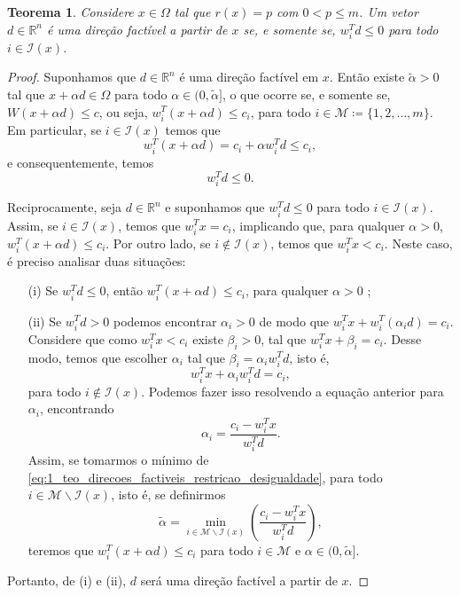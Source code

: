 \documentclass[12pt,a4paper]{scrartcl}
\def\RR{\mathds{R}}
\newtheorem{teo}{Teorema}
\theoremstyle{definition}%
\begin{document}
\begin{teo} \label{teo:direcoes_factiveis_restricao_desigualdade}
Considere $x\in \Omega$ tal que $r(x) = p$ com $0<p \leq m$. Um vetor $d \in \RR^{n}$ é uma direção factível a partir de $x$ se, e somente se, $w_{i}^{T}d \leq 0$ para todo $i \in \mathcal{I} (x)$.
\end{teo}
\begin{proof}
Suponhamos que $d\in \RR^{n}$ é uma direção factível em $x$. Então existe $\tilde{\alpha} >0$ tal que $x+\alpha d \in \Omega$ para todo $\alpha \in (0, \tilde{\alpha} ]$, o que ocorre se, e somente se, $W(x+\alpha d) \leq c$, ou seja, $w_{i}^{T}(x+\alpha d) \leq c_{i}$, para todo $i \in \mathcal{M} \coloneqq \{ 1,2, \ldots ,m \}$. 
Em particular, se $i\in \mathcal{I} (x)$ temos que
\[
w_{i}^{T}(x+\alpha d) = c_{i} + \alpha w_{i}^{T}d \leq c_{i},
\]
e consequentemente, temos
\[
w_{i}^{T}d \leq 0.
\]

Reciprocamente, seja $d\in \RR^{n}$ e suponhamos que $w_{i}^{T}d \leq 0$ para todo $i \in \mathcal{I} (x)$. Assim, se $i \in \mathcal{I} (x)$, temos que $w_{i}^{T} x = c_{i}$, implicando que, para qualquer $\alpha >0$, $w_{i}^{T}(x+\alpha d) \leq c_{i}$.
Por outro lado, se $i \notin \mathcal{I}(x)$, temos que $w_{i}^{T} x < c_{i}$. Neste caso, é preciso analisar duas situações:
\begin{enumerate}
	\item[(i)] Se $w_{i}^{T}d \leq 0$, então $w_{i}^{T}(x + \alpha d) \leq c_{i}$, para qualquer $\alpha >0$             ;

	\item[(ii)]Se $w_{i}^{T}d >0$ podemos encontrar $\alpha_{i} >0$ de modo que $w_{i}^{T}x + w_{i}^{T}(\alpha_{i} d) = c_{i}$. Considere que como $w_{i}^{T}x < c_{i}$ existe $\beta_{i} >0$, tal que $w_{i}^{T}x + \beta_{i} = c_{i}$. Desse modo, temos que escolher $\alpha_{i}$ tal que $\beta_{i} = \alpha_{i} w_{i}^{T} d$, isto é,
	\[
	w_{i}^{T}x + \alpha_{i} w_{i}^{T}d = c_{i} ,
	\]
	para todo $i \notin \mathcal{I}(x)$. Podemos fazer isso resolvendo a equação anterior para $\alpha_{i}$, encontrando
	\[ \label{eq:1_teo_direcoes_factiveis_restricao_desigualdade}
	\alpha_{i} = \dfrac{c_{i} - w_{i}^{T}x}{w_{i}^{T}d}.
	\]
	Assim, se tomarmos o mínimo de \eqref{eq:1_teo_direcoes_factiveis_restricao_desigualdade}, para todo $i \in \mathcal{M} \backslash \mathcal{I}(x)$, isto é, se definirmos
	\[ \label{eq:2_teo_direcoes_factiveis_restricao_desigualdade}
	\tilde{\alpha} = \min_{i \in \mathcal{M} \backslash \mathcal{I}(x) } \left( \dfrac{c_{i} - w_{i}^{T}x}{w_{i}^{T}d} \right) ,
	\]
	teremos que $w_{i}^{T}(x + \alpha d) \leq c_{i}$ para todo $i \in \mathcal{M}$ e $\alpha \in (0,\tilde{\alpha} ]$. 
\end{enumerate}	
Portanto, de (i) e (ii), $d$ será uma direção factível a partir de $x$.
\end{proof}
\end{document}
